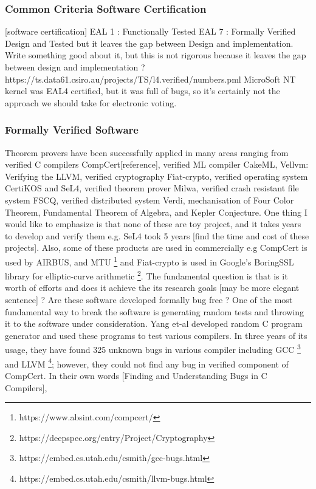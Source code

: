 	\subsubsection{Common Criteria Software Certification}    	
	[software certification]
	EAL 1 : Functionally Tested 
	EAL 7 : Formally Verified Design and Tested
	but it leaves the gap between Design and implementation.
	Write something good about it, but this is not rigorous because 
	it leaves the gap between design and implementation ? 
	https://ts.data61.csiro.au/projects/TS/l4.verified/numbers.pml	
	MicroSoft NT kernel was EAL4 certified, but it was full of bugs, 
	so it's certainly not the approach we should take for electronic 
	voting.		    
		    
	\subsubsection{Formally Verified Software}
	Theorem provers have been successfully applied in many areas ranging 
	from verified C compilers CompCert[reference], verified ML compiler
	CakeML, Vellvm: Verifying the LLVM, verified cryptography 
	Fiat-crypto, verified 
	operating system CertiKOS and SeL4, verified theorem prover Milwa, 
	verified crash resistant file system FSCQ, verified distributed system 
	Verdi, mechanisation of Four Color Theorem, Fundamental Theorem of 
	Algebra, and Kepler Conjecture.  One thing I would like to emphasize 
	is that none of these are toy project, and it takes years 
	to develop and verify them e.g. SeL4 took 5 years [find the time and 
	cost of these projects]. Also, some of these products 
	are used in commercially e.g CompCert is used by AIRBUS, and MTU
	\footnote{https://www.absint.com/compcert/} and Fiat-crypto is used 
	in Google's BoringSSL library for elliptic-curve arithmetic 
	\footnote{https://deepspec.org/entry/Project/Cryptography}. 
	The fundamental question 
	is that is it worth of efforts and does it achieve the its 
	research goals [may be more elegant sentence] ? Are 
	these software developed formally bug free ? 
	One of the most fundamental way to 
	break the software is generating random tests and throwing it to 
	the software under consideration. Yang et-al developed random 
	C program generator and used these programs to test various 
	compilers. In three years of its usage, they have found 325 unknown
	bugs in various compiler including GCC
	\footnote{https://embed.cs.utah.edu/csmith/gcc-bugs.html} and LLVM
	\footnote{https://embed.cs.utah.edu/csmith/llvm-bugs.html}; however, 
	they could not find any bug in verified component of CompCert. 
	In their own words [Finding and Understanding Bugs in C Compilers],
	
